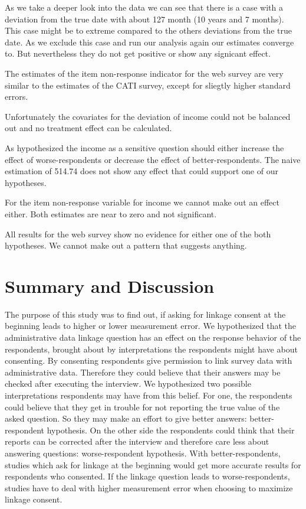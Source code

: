 As we take a deeper look into the data we can see that there is a case with a deviation from the true date with about 127 month (10 years and 7 months). This case might be to extreme compared to the others deviations from the true date. As we exclude this case and run our analysis again our estimates converge to. But nevertheless they do not get positive or show any signicant effect.

The estimates of the item non-response indicator for the web survey are very similar to the estimates of the CATI survey, except for sliegtly higher standard errors.

Unfortunately the covariates for the deviation of income could not be balanced out and no treatment effect can be calculated.

As hypothesized the income as a sensitive question should either increase the effect of worse-respondents or decrease the effect of better-respondents. The naive estimation of 514.74 does not show any effect that could support one of our hypotheses.

For the item non-response variable for income we cannot make out an effect either. Both estimates are near to zero and not significant.

All results for the web survey show no evidence for either one of the both hypotheses. We cannot make out a pattern that suggests anything.

\section{Summary and Discussion}

The purpose of this study was to find out, if asking for linkage consent at the beginning leads to higher or lower measurement error. We hypothesized that the administrative data linkage question has an effect on the response behavior of the respondents, brought about by interpretations the respondents might have about consenting. By consenting respondents give permission to link survey data with administrative data. Therefore they could believe that their answers may be checked after executing the interview. We hypothesized two possible interpretations respondents may have from this belief. For one, the respondents could believe that they get in trouble for not reporting the true value of the asked question. So they may make an effort to give better answers: better-respondent hypothesis. On the other side the respondents could think that their reports can be corrected after the interview and therefore care less about answering questions: worse-respondent hypothesis. With better-respondents, studies which ask for linkage at the beginning would get more accurate results for respondents who consented. If the linkage question leads to worse-respondents, studies have to deal with higher measurement error when choosing to maximize linkage consent.

